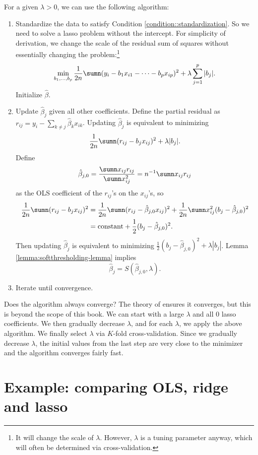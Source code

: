 For a given $\lambda>0$, we can use the following algorithm: 
\begin{enumerate}
\item Standardize the data to satisfy Condition \ref{condition::standardization}. 
So we need to solve a lasso problem without the intercept. For simplicity
of derivation, we change the scale of the residual sum of squares
without essentially changing the problem:\footnote{It will change the scale of $\lambda$. However, $\lambda$ is a tuning parameter anyway, which will often be determined via cross-validation.}
\[
\min_{b_{1},\ldots,b_{p}}\frac{1}{2n}\sumn(y_{i} -b_{1}x_{i1}-\cdots-b_{p}x_{ip})^{2}+\lambda\sum_{j=1}^{p}|b_{j}|.
\]
Initialize $\hat{\beta}.$

\item Update $\hat{\beta}_{j}$ given all other coefficients. Define the
partial residual as $r_{ij}=y_{i}-\sum_{k\neq j}\hat{\beta}_{k} x_{ik}$.
Updating $\hat{\beta}_{j}$ is equivalent to minimizing
\[
\frac{1}{2n}\sumn(r_{ij}-b_{j}x_{ij})^{2}+\lambda|b_{j}|.
\]
Define 
\[
\hat{\beta}_{j,0}=\frac{\sumn x_{ij}r_{ij}}{\sumn x_{ij}^{2}}=n^{-1}\sumn x_{ij}r_{ij}
\]
as the OLS coefficient of the $r_{ij}$'s on the $x_{ij}$'s, so 
\begin{align*}
\frac{1}{2n}\sumn(r_{ij}-b_{j}x_{ij})^{2} & =\frac{1}{2n}\sumn(r_{ij}-\hat{\beta}_{j,0}x_{ij})^{2}+\frac{1}{2n}\sumn x_{ij}^{2}(b_{j}-\hat{\beta}_{j,0})^{2}\\
 & =\text{constant}+\frac{1}{2}(b_{j}-\hat{\beta}_{j,0})^{2}.
\end{align*}
Then updating $\hat{\beta}_{j}$ is equivalent to minimizing $\frac{1}{2}(b_{j}-\hat{\beta}_{j,0})^{2}+\lambda|b_{j}|$.
Lemma \ref{lemma:softthresholding-lemma} implies 
\[
\hat{\beta}_{j}=S(\hat{\beta}_{j,0},\lambda).
\]

\item Iterate until convergence. 
\end{enumerate}


Does the algorithm always converge? 
The theory of \citet{tseng2001convergence} ensures it converges, but this is beyond the scope of this book. 
We can start with a large $\lambda$ and all 0 lasso coefficients. We then
gradually decrease $\lambda$, and for each $\lambda$, we apply the
above algorithm. We finally select $\lambda$ via $K$-fold cross-validation. Since we gradually decrease $\lambda$, the initial values from the last step are very close to the minimizer and the algorithm converges fairly fast. 


\section{Example: comparing OLS, ridge and lasso}\label{sec::lasso-example}


